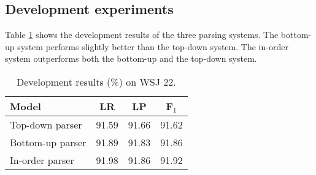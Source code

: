 \documentclass[11pt,letterpaper]{article}
\begin{document}
\subsection{Development experiments}
Table \ref{dev} shows the development results of the three parsing systems.
The bottom-up system performs slightly better than the top-down system.
The in-order system outperforms both the bottom-up and the top-down system.
\begin{table}[!tp]
\begin{center}
\renewcommand{\arraystretch}{0.8}
\begin{tabular}{>{\small}l|>{\small}c|>{\small}c|>{\small}c}
\hline
Model &  LR & LP & F$_1$ \\
\hline
\hline
Top-down parser & 91.59 & 91.66 & 91.62\\
Bottom-up parser & 91.89 & 91.83 & 91.86\\
In-order parser & 91.98 & 91.86 & 91.92\\
\hline 
\end{tabular}
\end{center}
\caption{\label{dev}  Development results (\%) on WSJ 22.}
\end{table}
\end{document}
